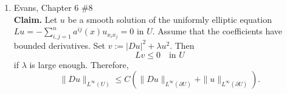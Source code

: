 \documentclass[a4paper]{article}
\newenvironment{claim}{\textbf{Claim.}}{}
\begin{document}
\begin{enumerate}
\begin{proof}
      Therefore, by using Young's inequality we get that for any $\varepsilon > 0$,
      \begin{align*}
        |B| &= \int_{U}^{} (|f| + |c(u)|) |v| dx \\
        &\leq \int_{U}^{} \frac{|f|^2}{2 \varepsilon} + \frac{|c(u)|^2}{2 \varepsilon} + \varepsilon |v|^2 dx \\
        &\leq \int_{U}^{} \frac{|f|^2}{2 \varepsilon} + \frac{|c(u)|^2}{2 \varepsilon} + C\varepsilon |D_k^h Du|^2 dx
      \end{align*}

      Take $\varepsilon = \frac{1}{2C}$. Then combining $A$ and $B$, we have
      \begin{align*}
        \| D_k^h Du \|_{L^2(U)}^2 &= |A| \\
        &= |B| \\
        &\leq \int_{U}^{} C (|f|^2 + |c(u)|^2)dx + \frac{1}{2} \| D_k^h Du \|_{L^2(U)}^2
      \end{align*}
      Thus,
      \[ \| D_k^h Du \|_{L^2(U)}^2 \leq 2C \int_{U}^{} |f|^2 + |c(u)|^2 dx .\]

      Because we know $c(u) \in L^2$, we have
      \[ \|D_k^h Du \|_L^2(U)^2 \leq 2C \left( \|f\|_{L^2}^2 + \|c(u)\|_{L^2}^2 \right) .\]
      Because $c(u) \in L^2$, the right hand side is a finite constant, so by Theorem 3 in Section 5.8.2 of Evans, $Du \in H^1(U)$. Therefore, $u \in
      H^2(U)$, and $\|D^2 u\|_{L^2} \leq C' \|f\|_{L^2}$ for some constant $C'$.

    \end{proof}

  \item Evans, Chapter 6 \#8 \\
    \begin{claim}
      Let $u$ be a smooth solution of the uniformly elliptic equation $Lu = - \sum_{i,j=1}^n a^{ij}(x) u_{x_i x_j} = 0$ in $U$. Assume that the
      coefficients have bounded derivatives.
      Set $v := |Du|^2 + \lambda u^2$. Then
      \[ Lv \leq 0 \quad \text{in } U \]
      if $\lambda$ is large enough. Therefore,
      \[ \| Du \|_{L^\infty(U)} \leq C \left( \| Du \|_{L^\infty(\partial U)} + \| u \|_{L^\infty(\partial U)} \right). \]
    \end{claim}


\end{enumerate}
\end{document}
